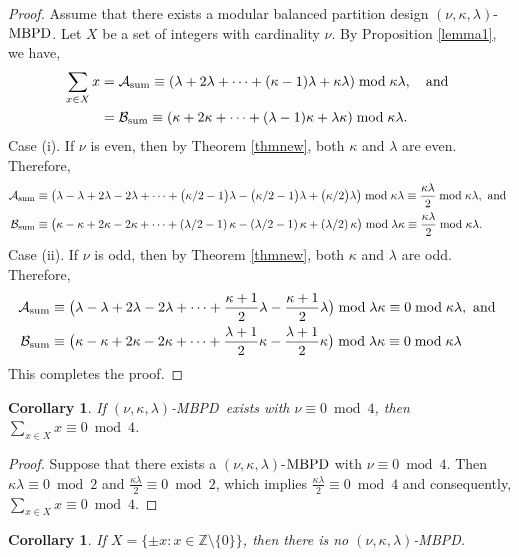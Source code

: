 \documentclass[preprint,11pt]{elsarticle}
\newcommand{\MBPD}{\textnormal{MBPD}}
\newtheorem{corollary}[theorem]{Corollary}
\begin{document}
\begin{proof}
    Assume that there exists a modular balanced partition design $(\nu, \kappa, \lambda)$-$\MBPD$. Let $X$ be a set of integers with cardinality $\nu$. By Proposition \ref{lemma1}, we have, 
    \begin{align}
       \sum_{x\in X}x & = \mathcal{A}_{\mathrm{sum}}\equiv(\lambda+2\lambda+\cdots+(\kappa-1)\lambda+\kappa\lambda)\bmod{\kappa\lambda},~~\textnormal{~and~}\\   
         & = \mathcal{B}_{\mathrm{sum}}\equiv (\kappa+2\kappa+\cdots+(\lambda-1)\kappa+\lambda\kappa)\bmod{\kappa\lambda}. \end{align}
    \noindent Case (i). If $\nu$ is even, then by Theorem \ref{thmnew}, both $\kappa$ and $\lambda$ are even. Therefore, 
    \begin{align*}
        \mathcal{A}_{\mathrm{sum}}& \equiv \bigl(\lambda-\lambda+2\lambda-2\lambda+\cdots+ \bigl(\kappa/2-1\bigr)\lambda-\bigl(\kappa/2-1\bigr)\lambda+\bigl(\kappa/2\bigr)\lambda\bigr)\bmod{\kappa\lambda}\equiv \frac{\kappa\lambda}{2}\bmod{\kappa\lambda}, \textnormal{~and~}\\
 \mathcal{B}_{\mathrm{sum}}& \equiv \bigl(\kappa-\kappa+2\kappa-2\kappa+\cdots+ \left(\lambda/2-1\right)\kappa-\left(\lambda/2-1\right)\kappa+\left(\lambda/2\right)\kappa\bigr)\bmod{\lambda\kappa}\equiv \frac{\kappa\lambda}{2}\bmod{\kappa\lambda}.
 \end{align*}
 \noindent Case (ii). If $\nu$ is odd, then by Theorem \ref{thmnew}, both $\kappa$ and $\lambda$ are odd. Therefore, 
 \begin{align*}
 \mathcal{A}_{\mathrm{sum}}& \equiv \bigl(\lambda-\lambda+2\lambda-2\lambda+\cdots+ \frac{\kappa+1}{2}\lambda-\frac{\kappa+1}{2}\lambda\bigr)\bmod{\lambda\kappa}\equiv 0\bmod{\kappa\lambda}, \textnormal{~and~} \\
\mathcal{B}_{\mathrm{sum}}& \equiv \bigl(\kappa-\kappa+2\kappa-2\kappa+\cdots+ \frac{\lambda+1}{2}\kappa-\frac{\lambda+1}{2}\kappa\bigr)\bmod{\lambda\kappa}\equiv 0\bmod{\kappa\lambda}       
    \end{align*}
    This completes the proof. 
\end{proof}
\begin{corollary}
    If $(\nu,\kappa,\lambda)$-\MBPD ~exists with $\nu\equiv 0 \bmod 4$, then $\displaystyle\sum_{x\in X}x\equiv 0\bmod 4$.
\end{corollary}
\begin{proof}
    Suppose that there exists a $(\nu, \kappa, \lambda)$-$\MBPD$  with $\nu \equiv 0 \bmod{4}$. Then $\kappa\lambda \equiv 0 \bmod{2}$ and $\frac{\kappa\lambda}{2}\equiv 0 \bmod{2}$, which implies $\frac{\kappa\lambda}{2}\equiv 0 \bmod{4}$ and consequently, $\displaystyle\sum_{x\in X}x\equiv 0 \bmod{4}$. 
\end{proof}
\begin{corollary}
    If $X=\{\pm x : x\in \mathbb{Z}\setminus\{0\}\}$, then there is no $(\nu, \kappa, \lambda)$-\MBPD. 
\end{corollary}
\end{document}

